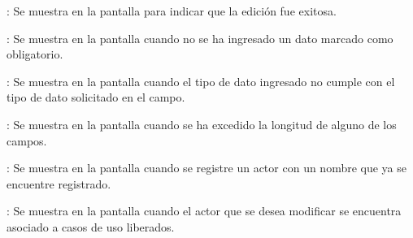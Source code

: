 \begin{Citemize}
	\item {}: Se muestra en la pantalla  para indicar que la edición fue exitosa.
	\item {}: Se muestra en la pantalla  cuando no se ha ingresado un dato marcado como obligatorio.
	\item {}: Se muestra en la pantalla  cuando el tipo de dato ingresado no cumple con el tipo de dato solicitado en el campo.
	\item {}: Se muestra en la pantalla  cuando se ha excedido la longitud de alguno de los campos.
	\item {}: Se muestra en la pantalla  cuando se registre un actor con un nombre que ya se encuentre registrado.
	\item {}: Se muestra en la pantalla  cuando el actor que se desea modificar se encuentra asociado a casos de uso liberados.
\end{Citemize}
